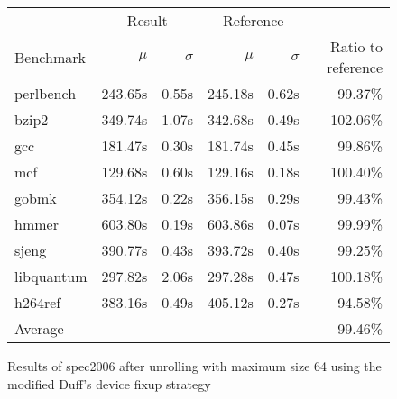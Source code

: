 \begin{figure}[bh]
    \begin{center}
        \begin{tabular}{lrrrrr}
            \toprule
            & \multicolumn{2}{c}{Result} & \multicolumn{2}{c}{Reference}\\
            Benchmark & $\mu$ & $\sigma$ & $\mu$ & $\sigma$ & Ratio to reference\\
            \midrule
            perlbench & 243.65s & 0.55s & 245.18s & 0.62s & 99.37\%\\
            bzip2 & 349.74s & 1.07s & 342.68s & 0.49s & 102.06\%\\
            gcc & 181.47s & 0.30s & 181.74s & 0.45s & 99.86\%\\
            mcf & 129.68s & 0.60s & 129.16s & 0.18s & 100.40\%\\
            gobmk & 354.12s & 0.22s & 356.15s & 0.29s & 99.43\%\\
            hmmer & 603.80s & 0.19s & 603.86s & 0.07s & 99.99\%\\
            sjeng & 390.77s & 0.43s & 393.72s & 0.40s & 99.25\%\\
            libquantum & 297.82s & 2.06s & 297.28s & 0.47s & 100.18\%\\
            h264ref & 383.16s & 0.49s & 405.12s & 0.27s & 94.58\%\\
            \midrule
            Average & & & & & 99.46\%\\
            \bottomrule
        \end{tabular}
    \end{center}
    \caption{Results of spec2006 after unrolling with maximum size 64 using the modified Duff's device fixup strategy}
    \label{fig:eval:perf:duff:64}
\end{figure}

